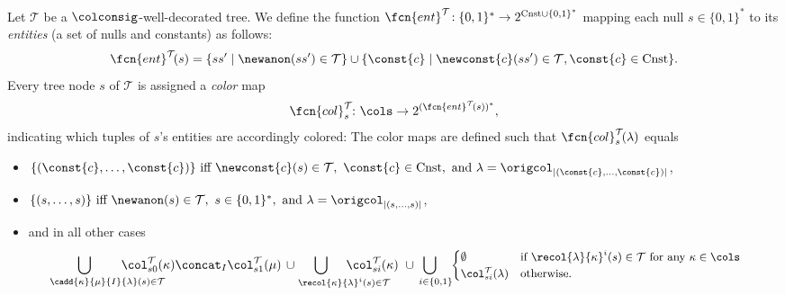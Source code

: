 \begin{definition}\label{def:entities-tree-to-instance}
Let $\mathcal{T}$ be a $\colconsig$-well-decorated tree.
We define the function $\fcn{ent}^\mathcal{T}\!:\{0,1\}^* \to 2^{\mathrm{Cnst} \cup \{0,1\}^*}$ mapping each null $s \in \{0,1\}^*$ to its \emph{entities} (a set of nulls and constants) as follows:
%
$$\fcn{ent}^\mathcal{T}\!(s) = \{ ss' \mid \newanon(ss') \in \mathcal{T}\} \cup \{ \const{c} \mid \newconst{c}(ss') \in \mathcal{T}, \const{c}\in \mathrm{Cnst}\}.$$%
%
Every tree node $s$ of $\mathcal{T}$ is assigned a \emph{color} map
$$\fcn{col}^{\mathcal{T}}_s\! \colon \cols \to 2^{(\fcn{ent}^{\mathcal{T}}\!(s))^{\ast}},$$%
indicating which tuples of $s$'s entities are accordingly colored: The color maps are defined such that $\fcn{col}^{\mathcal{T}}_{s}\!(\lambda)$ equals
\begin{itemize}
\item	
$\{ (\const{c}, \ldots, \const{c}) \}  \text{\ iff } \newconst{c}(s)\in \mathcal{T},\ \const{c}\in \mathrm{Cnst}, \text{ and } \lambda=\origcol_{|(\const{c}, \ldots, \const{c})|}$,
\item	
	$\{ (s, \ldots, s) \}  \text{\ iff } \newanon(s)\in \mathcal{T},\  s\in \{0,1\}^*, \text{ and } \lambda=\origcol_{|(s, \ldots, s)|}$,
\item and in all other cases
    \begin{align*}
	& \hspace{-10ex}\bigcup_{\hspace{8.5ex}\cadd{\kappa}{\mu}{I}{\lambda}(s)\in\mathcal{T}} \hspace{-8.5ex}\col_{s0}^{\mathcal{T}}(\kappa)\concat_{I}\col_{s1}^{\mathcal{T}}(\mu)
	\  \! \cup \! \hspace{-8ex}\bigcup_{\hspace{8.5ex}\recol{\kappa}{\lambda}^{i}(s)\in\mathcal{T}}\hspace{-8.5ex}\col_{si}^{\mathcal{T}}(\kappa)
 \ \cup \!\!\! \bigcup_{\ \ i\in \{0,1\}\!\!}
	\small
	\begin{cases}\footnotesize
		\emptyset & \text{if } \recol{\lambda}{\kappa}^{i}(s)\in\mathcal{T} \text{ for any } \kappa\in\cols \\
		\col_{si}^{\mathcal{T}}(\lambda) & \text{otherwise}.
	\end{cases}
\end{align*}
\end{itemize}
%

\end{definition}
